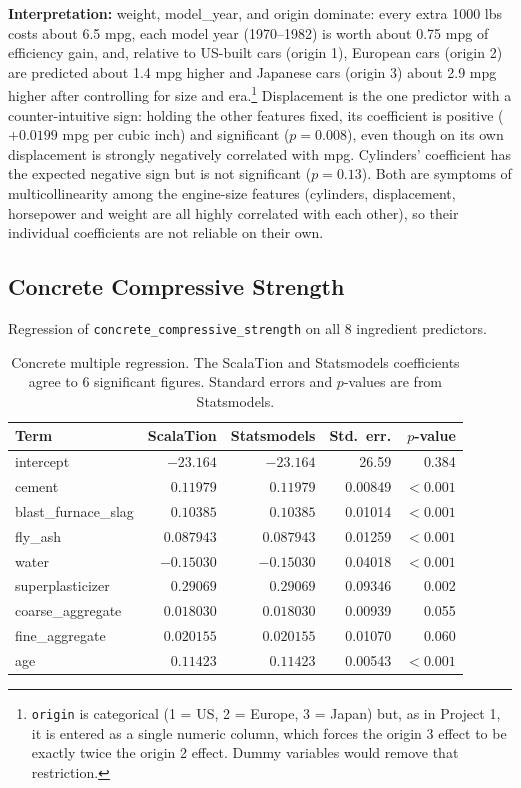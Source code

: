 \documentclass[11pt]{article}
\begin{document}
\textbf{Interpretation:} weight, model\_year, and origin dominate: every
extra 1000 lbs costs about 6.5 mpg, each model year (1970--1982) is worth
about 0.75 mpg of efficiency gain, and, relative to US-built cars (origin 1),
European cars (origin 2) are predicted about 1.4 mpg higher and Japanese cars
(origin 3) about 2.9 mpg higher after controlling for size and
era.\footnote{\texttt{origin} is categorical (1 = US, 2 = Europe, 3 = Japan)
but, as in Project 1, it is entered as a single numeric column, which forces
the origin 3 effect to be exactly twice the origin 2 effect. Dummy variables
would remove that restriction.} Displacement is the one predictor with a
counter-intuitive sign: holding the other features fixed, its coefficient is
positive ($+0.0199$ mpg per cubic inch) and significant ($p=0.008$), even though
on its own displacement is strongly negatively correlated with mpg. Cylinders'
coefficient has the expected negative sign but is not significant
($p=0.13$). Both are symptoms of multicollinearity among the engine-size
features (cylinders, displacement, horsepower and weight are all highly
correlated with each other), so their individual coefficients are not reliable
on their own.

\subsection{Concrete Compressive Strength}
Regression of \texttt{concrete\_compressive\_strength} on all 8 ingredient
predictors.

\begin{table}[H]
\centering
\caption{Concrete multiple regression. The ScalaTion and Statsmodels
coefficients agree to 6 significant figures. Standard errors and $p$-values
are from Statsmodels.}
\begin{tabular}{lrrrr}
\toprule
Term & ScalaTion & Statsmodels & Std.\ err. & $p$-value \\
\midrule
intercept & $-23.164$ & $-23.164$ & 26.59 & 0.384 \\
cement & $0.11979$ & $0.11979$ & 0.00849 & $<0.001$ \\
blast\_furnace\_slag & $0.10385$ & $0.10385$ & 0.01014 & $<0.001$ \\
fly\_ash & $0.087943$ & $0.087943$ & 0.01259 & $<0.001$ \\
water & $-0.15030$ & $-0.15030$ & 0.04018 & $<0.001$ \\
superplasticizer & $0.29069$ & $0.29069$ & 0.09346 & 0.002 \\
coarse\_aggregate & $0.018030$ & $0.018030$ & 0.00939 & 0.055 \\
fine\_aggregate & $0.020155$ & $0.020155$ & 0.01070 & 0.060 \\
age & $0.11423$ & $0.11423$ & 0.00543 & $<0.001$ \\
\bottomrule
\end{tabular}
\end{table}
\end{document}
